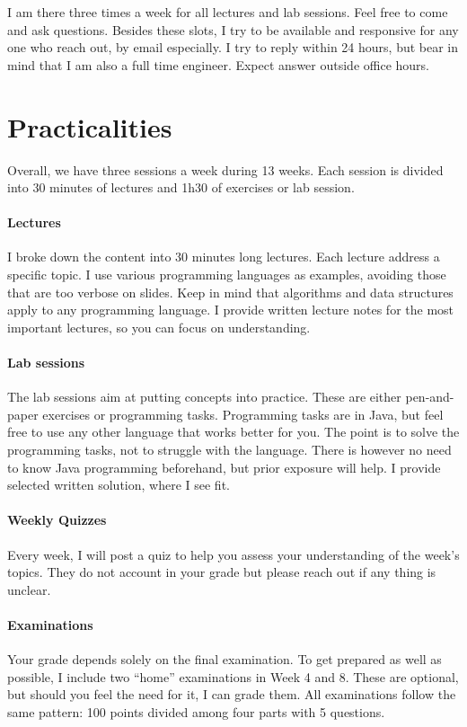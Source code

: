\documentclass{aldast}
\begin{document}
I am there three times a week for all lectures and lab sessions. Feel
free to come and ask questions. Besides these slots, I try to be
available and responsive for any one who reach out, by email
especially. I try to
reply within 24 hours, but bear in mind that I am also a full time
engineer. Expect answer outside office hours.

\section{Practicalities}
Overall, we have three sessions a week during 13 weeks. Each session is
divided into 30 minutes of lectures and 1h30 of exercises or lab
session.

\paragraph {Lectures}
I broke down the content into 30 minutes long lectures. Each lecture
address a specific topic. I use various programming languages as
examples, avoiding those that are too verbose on slides. Keep in mind
that algorithms and data structures apply to any programming
language. I provide written lecture notes for the most important
lectures, so you can focus on understanding.

\paragraph {Lab sessions}
The lab sessions aim at putting concepts into practice. These are
either pen-and-paper exercises or programming tasks. Programming tasks
are in Java, but feel free to use any other language that works better
for you. The point is to solve the programming tasks, not to struggle
with the language. There is however no need to know Java programming
beforehand, but prior exposure will help. I provide selected written
solution, where I see fit.

\paragraph {Weekly Quizzes}
Every week, I will post a quiz to help you assess your understanding
of the week's topics. They do not account in your grade but please
reach out if any thing is unclear.

\paragraph{Examinations}
Your grade depends solely on the final examination. To get prepared as
well as possible, I include two ``home'' examinations in Week 4 and
8. These are optional, but should you feel the need for it, I can
grade them. All examinations follow the same pattern: 100 points
divided among four parts with 5 questions.
\end{document}
